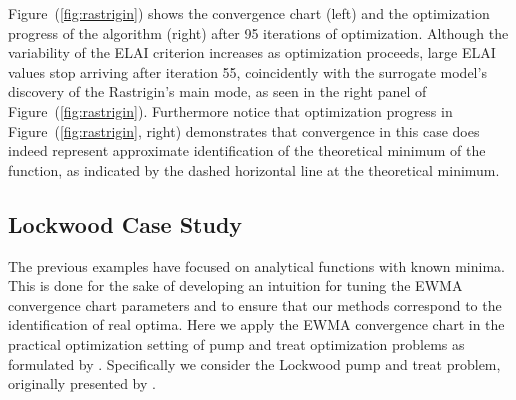 \documentclass[12pt]{article}
\begin{document}
%
%

%
Figure~(\ref{fig:rastrigin}) shows the convergence chart (left) and the optimization progress of the algorithm (right) after 95 iterations of optimization.
%
Although the variability of the ELAI criterion increases as optimization proceeds, large ELAI values stop arriving after iteration 55, coincidently with the surrogate model's discovery of the Rastrigin's main mode, as seen in the right panel of Figure~(\ref{fig:rastrigin}).
%
Furthermore notice that optimization progress in Figure~(\ref{fig:rastrigin}, right) demonstrates that convergence in this case does indeed represent approximate identification of the theoretical minimum of the function, as indicated by the dashed horizontal line at the theoretical minimum. 


%
%
%


%
%
\subsection{Lockwood Case Study}
\label{sec:lockwood}
%
%

The previous examples have focused on analytical functions with known minima.
%
This is done for the sake of developing an intuition for tuning the EWMA convergence chart parameters and to ensure that our methods correspond to the identification of real optima.
Here we apply the EWMA convergence chart in the practical optimization setting of pump and treat optimization problems as formulated by \cite{mayer2002optimal}.
%
Specifically we consider the Lockwood pump and treat problem, originally presented by \cite{lockCite}. %
\end{document}
